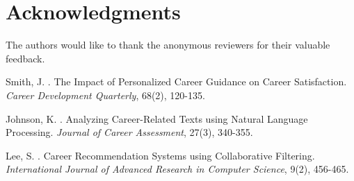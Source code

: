 \documentclass[12pt,a4paper]{article}
\begin{document}
\section*{Acknowledgments}
The authors would like to thank the anonymous reviewers for their valuable feedback.


\begin{thebibliography}{99}

Smith, J. . The Impact of Personalized Career Guidance on Career Satisfaction. \emph{Career Development Quarterly}, 68(2), 120-135.

Johnson, K. . Analyzing Career-Related Texts using Natural Language Processing. \emph{Journal of Career Assessment}, 27(3), 340-355.

Lee, S. . Career Recommendation Systems using Collaborative Filtering. \emph{International Journal of Advanced Research in Computer Science}, 9(2), 456-465.

\end{thebibliography}
\end{document}

